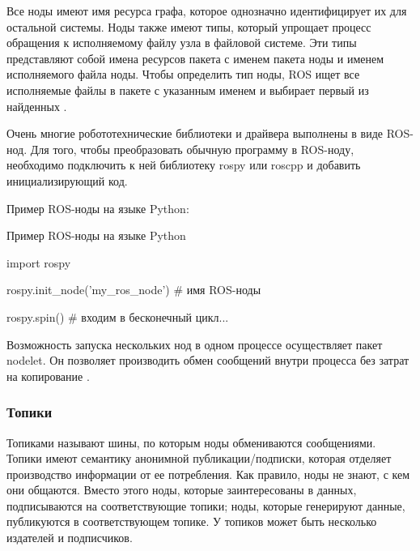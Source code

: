 Все ноды имеют имя ресурса графа, которое однозначно идентифицирует их для остальной системы. Ноды также имеют типы, который упрощает процесс обращения к исполняемому файлу узла в файловой системе. Эти типы представляют собой имена ресурсов пакета с именем пакета ноды и именем исполняемого файла ноды. Чтобы определить тип ноды, ROS ищет все исполняемые файлы в пакете с указанным именем и выбирает первый из найденных \cite{ros}. 


Очень многие робототехнические библиотеки и драйвера выполнены в виде ROS-нод.
Для того, чтобы преобразовать обычную программу в ROS-ноду, необходимо подключить к ней библиотеку rospy или roscpp и добавить инициализирующий код.

Пример ROS-ноды на языке Python:

\begin{Program}[H]
	\caption{Пример ROS-ноды на языке Python} \label{lst:1}
\begin{MyCode}
import rospy
		
rospy.init_node('my_ros_node')  # имя ROS-ноды
		
rospy.spin()  # входим в бесконечный цикл...
\end{MyCode}
\end{Program}

Возможность запуска нескольких нод в одном процессе осуществляет пакет nodelet. Он позволяет производить обмен сообщений внутри процесса без затрат на копирование \cite{ros}.

\subsubsection{Топики}
Топиками называют шины, по которым ноды обмениваются сообщениями. Топики имеют семантику анонимной публикации/подписки, которая отделяет производство информации от ее потребления. Как правило, ноды не знают, с кем они общаются. Вместо этого ноды, которые заинтересованы в данных, подписываются на соответствующие топики; ноды, которые генерируют данные, публикуются в соответствующем топике. У топиков может быть несколько издателей и подписчиков.

